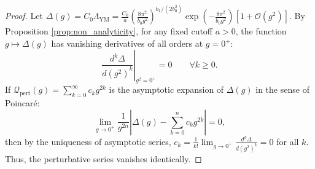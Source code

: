 \begin{proof}
Let $\Delta(g) = C_0 \Lambda_{\mathrm{YM}} = \frac{C_0}{a} \left(\frac{8\pi^2}{b_0 g^2}\right)^{b_1/(2b_0^2)} \exp\left(-\frac{8\pi^2}{b_0 g^2}\right) [1 + \mathcal{O}(g^2)]$. By Proposition \ref{prop:non_analyticity}, for any fixed cutoff $a > 0$, the function $g \mapsto \Delta(g)$ has vanishing derivatives of all orders at $g = 0^+$:
\begin{equation}
\left. \frac{d^k \Delta}{d(g^2)^k} \right|_{g^2 = 0^+} = 0 \qquad \forall k \ge 0.
\end{equation}
If $\mathcal{Q}_{\mathrm{pert}}(g) = \sum_{k=0}^\infty c_k g^{2k}$ is the asymptotic expansion of $\Delta(g)$ in the sense of Poincaré:
\begin{equation}
\lim_{g \to 0^+} \frac{1}{g^{2n}} \left| \Delta(g) - \sum_{k=0}^n c_k g^{2k} \right| = 0,
\end{equation}
then by the uniqueness of asymptotic series, $c_k = \frac{1}{k!} \lim_{g \to 0^+} \frac{d^k \Delta}{d(g^2)^k} = 0$ for all $k$. Thus, the perturbative series vanishes identically.
\end{proof}

